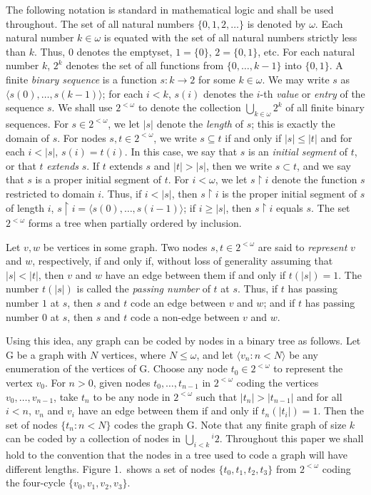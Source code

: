 \documentclass{amsart}
\theoremstyle{remark}
\theoremstyle{definition}
\theoremstyle{remark}
\newcommand{\om}{\omega}
\newcommand{\sse}{\subseteq}
\newcommand{\re}{\restriction}
\newcommand{\G}{\mathrm{G}}
\newcommand{\ra}{\rightarrow}
\newcommand{\lgl}{\langle}
\newcommand{\rgl}{\rangle}
\begin{document}
The following notation is standard in mathematical logic and shall be used throughout.
The set of all natural numbers $\{0,1,2,\dots\}$ is denoted by $\om$.
Each natural number  $k\in\om$
is equated with  the set  of all natural numbers strictly less than $k$.
Thus, $0$ denotes the emptyset, $1=\{0\}$,  $2=\{0,1\}$, etc.
For each natural number $k$, $2^k$  denotes
 the set of all functions from $\{0,\dots, k-1\}$ into $\{0,1\}$.
A finite {\em binary sequence} is a function
 $s:k\ra 2$ for some $k\in \om$.
We may  write $s$ as $\lgl s(0), \dots, s(k-1)\rgl$;
 for each $i<k$, $s(i)$ denotes the $i$-th {\em value} or {\em entry}  of the sequence $s$.
We shall  use  $2^{<\om}$  to denote the collection $\bigcup_{k\in \om}2^k$
 of all finite binary sequences.
For $s\in 2^{<\om}$, we let $|s|$ denote the {\em length} of $s$; this is exactly the domain of $s$.
For nodes $s,t\in 2^{<\om}$, we write
$s\sse t$ if and only if $|s|\le |t|$ and for each $i<|s|$, $s(i)=t(i)$.
In this case, we say that  $s$ is an {\em initial segment} of $t$, or that $t$ {\em extends} $s$.
If $t$ extends $s$ and $|t|>|s|$, then we write $s\subset t$, and we say that $s$ is a proper initial segment of $t$.
For $i<\om$, we let $s\re i$ denote
the function $s$ restricted to domain $i$.
Thus, if $i< |s|$, then $s\re i$ is
 the proper initial segment of $s$ of length $i$, $s\re i=\lgl s(0),\dots, s(i-1)\rgl$;
if $i\ge |s|$, then $s\re i$  equals $s$.
The set $2^{<\om}$ forms a tree when partially ordered by inclusion.


Let $v,w$ be vertices in some graph.
Two nodes
 $s,t\in 2^{<\om}$  are said to   {\em represent} $v$ and $w$,  respectively, if and only if,  without loss of generality assuming that $|s|<|t|$,
then
$v$ and $w$ have an edge between them
if and only if
 $t(|s|)=1$.
The number $t(|s|)$ is called the {\em passing number} of $t$ at $s$.
Thus, if $t$ has  passing number  $1$  at $s$, then
$s$ and $t$ code an edge  between $v$ and $w$;
and if $t$ has passing number $0$ at $s$, then $s$ and $t$ code a non-edge between $v$ and $w$.


Using this idea, any graph can be coded by nodes in a binary tree as follows.
Let $\G$ be a  graph with $N$ vertices,
where $N\le \om$,
and
let  $\lgl v_n:n<N\rgl$ be any enumeration of
the vertices of  $\G$.
Choose any node  $t_0\in 2^{<\om}$ to  represent the vertex $v_0$.
For  $n>0$,
given nodes $t_0,\dots,t_{n-1}$  in $2^{<\om}$ coding the vertices $v_0,\dots,v_{n-1}$,
take  $t_n$  to be any node in $2^{<\om}$  such that
 $|t_n|>|t_{n-1}|$ and
 for all $i< n$,
$v_n$ and $ v_i$ have an edge between them if and only if $t_n(|t_i|)=1$.
Then the set of nodes $\{t_n:n<N\}$  codes the graph $\G$.
Note that any finite graph of size $k$ can be coded by a collection of  nodes in $\bigcup_{i<k}{}^i 2$.
Throughout this paper we shall hold to the convention that the nodes in a tree used to code a
 graph will have different lengths.
Figure 1.\  shows a  set of nodes $\{t_0,t_1,t_2,t_3\}$  from $2^{<\om}$  coding the four-cycle $\{v_0,v_1,v_2,v_3\}$.
\end{document}
